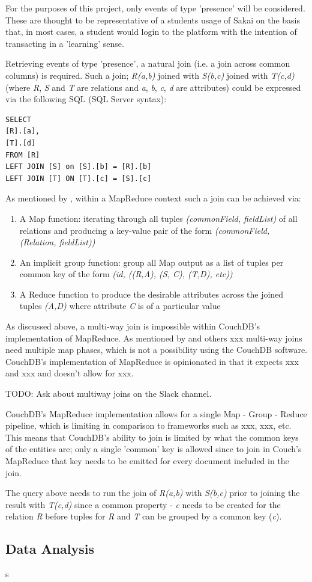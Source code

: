 For the purposes of this project, only events of type 'presence' will be considered. These are thought to be representative of a students usage of Sakai on the basis that, in most cases, a student would login to the platform with the intention of transacting in a 'learning' sense.

Retrieving events of type 'presence', a natural join (i.e. a join across common columns) is required. Such a join; \textit{R(a,b)} joined with \textit{S(b,c)} joined with \textit{T(c,d)} (where \textit{R}, \textit{S} and \textit{T} are relations and \textit{a}, \textit{b}, \textit{c}, \textit{d} are attributes) could be expressed via the following SQL (SQL Server syntax):

\begin{verbatim}
SELECT
[R].[a],
[T].[d]
FROM [R]
LEFT JOIN [S] on [S].[b] = [R].[b]
LEFT JOIN [T] ON [T].[c] = [S].[c]
\end{verbatim}

As mentioned by \cite{mining2011}, within a MapReduce context such a join can be achieved via:
\begin{enumerate}
    \item A Map function: iterating through all tuples \textit{(commonField, fieldList)} of all relations and producing a key-value pair of the form \textit{(commonField, (Relation, fieldList))}
    \item An implicit group function: group all Map output as a list of tuples per common key of the form \textit{(id, ((R,A), (S, C), (T,D), etc))}
    \item A Reduce function to produce the desirable attributes across the joined tuples \textit{(A,D)} where attribute \textit{C} is of a particular value
\end{enumerate}

As discussed above, a multi-way join is impossible within CouchDB's implementation of MapReduce. As mentioned by \cite{chandar2010} and others xxx multi-way joins need multiple map phases, which is not a possibility using the CouchDB software. CouchDB's implementation of MapReduce is opinionated in that it expects xxx and xxx and doesn't allow for xxx.

TODO: Ask about multiway joins on the Slack channel.

CouchDB's MapReduce implementation allows for a single Map - Group - Reduce pipeline, which is limiting in comparison to frameworks such as xxx, xxx, etc. This means that CouchDB's ability to join is limited by what the common keys of the entities are; only a single 'common' key is allowed since to join in Couch's MapReduce that key needs to be emitted for every document included in the join.

The query above needs to run the join of \textit{R(a,b)} with \textit{S(b,c)} prior to joining the result with \textit{T(c,d)} since a common property - \textit{c} needs to be created for the relation \textit{R} before tuples for \textit{R} and \textit{T} can be grouped by a common key (\textit{c}).


\subsection{Data Analysis}
s